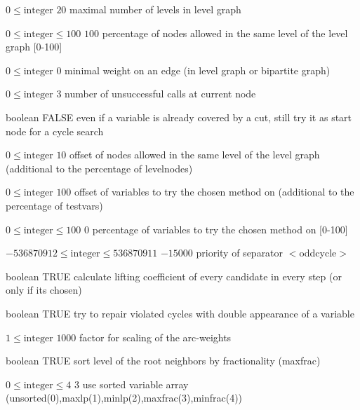 %
{$0\leq\textrm{integer}$}%
{$20$}%
{maximal number of levels in level graph}%
{}

%
{$0\leq\textrm{integer}\leq100$}%
{$100$}%
{percentage of nodes allowed in the same level of the level graph [0-100]}%
{}

%
{$0\leq\textrm{integer}$}%
{$0$}%
{minimal weight on an edge (in level graph or bipartite graph)}%
{}

%
{$0\leq\textrm{integer}$}%
{$3$}%
{number of unsuccessful calls at current node}%
{}

%
{boolean}%
{FALSE}%
{even if a variable is already covered by a cut, still try it as start node for a cycle search}%
{}

%
{$0\leq\textrm{integer}$}%
{$10$}%
{offset of nodes allowed in the same level of the level graph (additional to the percentage of levelnodes)}%
{}

%
{$0\leq\textrm{integer}$}%
{$100$}%
{offset of variables to try the chosen method on (additional to the percentage of testvars)}%
{}

%
{$0\leq\textrm{integer}\leq100$}%
{$0$}%
{percentage of variables to try the chosen method on [0-100]}%
{}

%
{$-536870912\leq\textrm{integer}\leq536870911$}%
{$-15000$}%
{priority of separator $<$oddcycle$>$}%
{}

%
{boolean}%
{TRUE}%
{calculate lifting coefficient of every candidate in every step (or only if its chosen)}%
{}

%
{boolean}%
{TRUE}%
{try to repair violated cycles with double appearance of a variable}%
{}

%
{$1\leq\textrm{integer}$}%
{$1000$}%
{factor for scaling of the arc-weights}%
{}

%
{boolean}%
{TRUE}%
{sort level of the root neighbors by fractionality (maxfrac)}%
{}

%
{$0\leq\textrm{integer}\leq4$}%
{$3$}%
{use sorted variable array (unsorted(0),maxlp(1),minlp(2),maxfrac(3),minfrac(4))}%
{}


